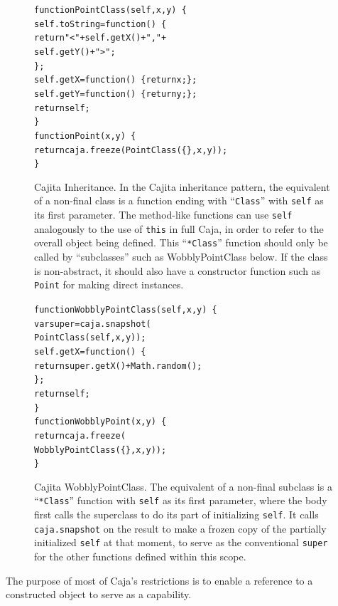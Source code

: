 \documentclass[letterpaper,twocolumn,10pt]{article}
\newcommand{\code}[1]{{\tt {#1}}}              %
\begin{document}
\begin{figure}
\begin{alltt}
function PointClass(self, x, y)\ \{
  self.toString = function()\ \{ 
    return "<" + self.getX() + "," + 
                 self.getY() + ">"; 
  \};
  self.getX = function()\ \{ return x; \};
  self.getY = function()\ \{ return y; \};
  return self;
\}
function Point(x, y)\ \{
  return caja.freeze(PointClass(\{\}, x, y));
\}
\end{alltt}

\caption[Cajita Inheritance.]{Cajita Inheritance. In the Cajita inheritance 
pattern, the equivalent of a non-final class is a function ending with 
``\code{Class}'' with \code{self} as its first parameter. The method-like 
functions can use \code{self} analogously to the use of \code{this} in full 
Caja, in order to refer to the overall object being defined. This 
``\code{*Class}'' function should only be called by ``subclasses'' such as 
WobblyPointClass below. If the class is non-abstract, it should also have a 
constructor function such as
\code{Point} for making direct instances.}
\label{fig:cajita-super-point}
\end{figure}

\begin{figure}
\begin{alltt}
function WobblyPointClass(self, x, y)\ \{
  var super = caja.snapshot(
                PointClass(self, x, y));
  self.getX = function()\ \{ 
    return super.getX() + Math.random(); 
  \};
  return self;
\}
function WobblyPoint(x, y)\ \{
  return caja.freeze(
           WobblyPointClass(\{\}, x, y));
\}
\end{alltt}

\caption[Cajita WobblyPointClass.]{Cajita WobblyPointClass. The equivalent of 
a non-final subclass is a ``\code{*Class}'' function with \code{self} as its 
first parameter, where the body first calls the superclass to do its part of 
initializing \code{self}. It calls \code{caja.snapshot} on the result to make 
a frozen copy of the partially initialized \code{self} at that moment, to 
serve as the conventional \code{super} for the other functions defined within 
this scope.}
\label{fig:cajita-super-wobbly-point}
\end{figure}



The purpose of most of Caja's restrictions is to enable a reference to a 
constructed object to serve as a capability.
\end{document}
